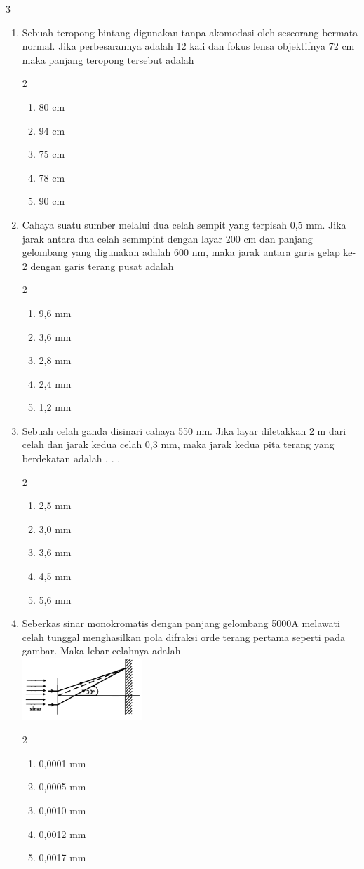 \documentclass[10pt,a4paper]{extarticle}
\newcommand{\pilgani}[1]{                            \vspace{-0.3cm}\begin{multicols}{2}
 \begin{enumerate}[label=\Alph*., itemsep=0pt,topsep=0pt,leftmargin=*,align=Center]#1                     \end{enumerate}
 \phantom{ini cuma sapi, wedus, dan ayam}
 \end{multicols}}
\begin{document}
\begin{multicols}{3}
\begin{enumerate}
\item Sebuah teropong bintang digunakan tanpa akomodasi oleh seseorang bermata normal. Jika perbesarannya adalah 12 kali  dan fokus lensa objektifnya 72 cm maka panjang teropong tersebut adalah
\pilgani{
   \item 80 cm
   \item 94 cm
   \item 75 cm
   \item 78 cm
   \item 90 cm}

\item Cahaya suatu sumber melalui dua celah sempit yang terpisah 0,5 mm. Jika  jarak antara dua celah semmpint dengan layar 200 cm dan panjang gelombang yang digunakan adalah 600 nm, maka jarak antara garis gelap ke-2 dengan garis terang pusat adalah 
\pilgani{
   \item 9,6 mm
   \item 3,6 mm
   \item 2,8 mm
   \item 2,4 mm
   \item 1,2 mm}
\vspace{2cm}

\item Sebuah celah ganda disinari cahaya 550 nm. Jika layar diletakkan 2 m dari celah dan jarak kedua celah 0,3 mm, maka jarak kedua pita terang yang berdekatan adalah . . .
\pilgani{
   \item 2,5 mm
   \item 3,0 mm
   \item 3,6 mm
   \item 4,5 mm
   \item 5,6 mm
   }
   \vspace{2cm}

  \item Seberkas sinar monokromatis dengan panjang gelombang 5000A melawati celah tunggal menghasilkan pola difraksi orde terang pertama seperti pada gambar. Maka lebar celahnya adalah\\
  \includegraphics[width=4.5cm]{pic/lab-1}
  \pilgani{
     \item 0,0001 mm
     \item 0,0005 mm
     \item 0,0010 mm
     \item 0,0012 mm
     \item 0,0017 mm}


\end{enumerate}
\end{multicols}
\end{document}
